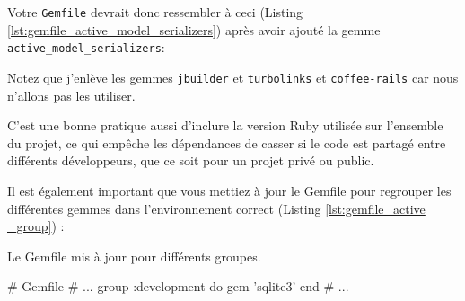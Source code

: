 \documentclass[]{report}
\begin{document}
        Votre \verb|Gemfile| devrait donc ressembler à ceci (Listing \ref{lst:gemfile_active_model_serializers}) après avoir ajouté la gemme \verb|active_model_serializers|:



        Notez que j'enlève les gemmes \verb|jbuilder| et \verb|turbolinks| et \verb|coffee-rails| car nous n'allons pas les utiliser.

        C'est une bonne pratique aussi d'inclure la version Ruby utilisée sur l'ensemble du projet, ce qui empêche les dépendances de casser si le code est partagé entre différents développeurs, que ce soit pour un projet privé ou public.

        Il est également important que vous mettiez à jour le Gemfile pour regrouper les différentes gemmes dans l'environnement correct (Listing \ref{lst:gemfile_active _group}) :

        \begin{listing}
          \caption{Le Gemfile mis à jour pour différents groupes.}
          \label{lst:gemfile_active_group}
          \begin{rubycode}
          # Gemfile
          # ...
          group :development do
            gem 'sqlite3'
          end
          # ...
        \end{rubycode}
      \end{listing}
\end{document}
